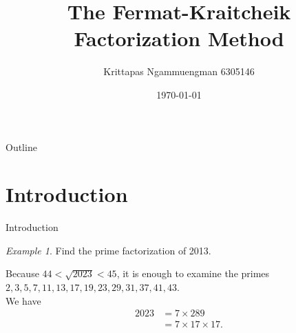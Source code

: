 \documentclass[11pt,aspectratio=43,xcolor={dvipsnames},notheorems]{beamer}
\title{The Fermat-Kraitcheik Factorization Method}
\author[Krittapas N.]{Krittapas Ngammuengman 6305146}
\date{\today}
\theoremstyle{definition}
\theoremstyle{plain}
\theoremstyle{remark}
\newtheorem{example}{Example}
\begin{document}
\nocite{*}
\maketitle
\begin{frame}{Outline}
\tableofcontents
\end{frame}
\section{Introduction}
\begin{frame}{Introduction}
\begin{example}
    Find the prime factorization of 2013.
\end{example}
\pause
Because $44<\sqrt{2023}<45$, it is enough to examine the primes $2,3,5,7,11,13,17,19,23,29,31,37,41,43$.\\
We have
\vspace{-1\baselineskip}
    \begin{align*}
        2023&=7\times 289\\
        &=7\times 17\times 17.
    \end{align*}
\end{frame}
\end{document}
